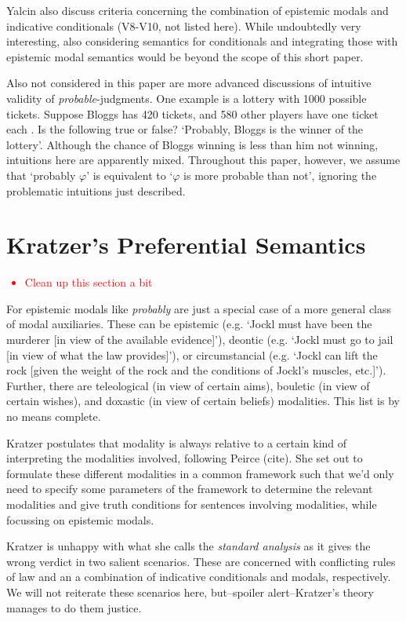 \documentclass{article}
\theoremstyle{definition}
\newcommand\todo[1]{\textcolor{red}{#1}}
\begin{document}
Yalcin also discuss criteria concerning the combination of epistemic modals and indicative conditionals (V8-V10, not listed here). While undoubtedly very interesting, also considering semantics for conditionals and integrating those with epistemic modal semantics would be beyond the scope of this short paper.

Also not considered in this paper are more advanced discussions of intuitive validity of \emph{probable}-judgments. One example is a lottery with 1000 possible tickets.
Suppose Bloggs has 420 tickets, and 580 other players have one ticket each \parencite[p.~931]{yalcin10_probab_operat}. Is the following true or false?
`Probably, Bloggs is the winner of the lottery'. Although the chance of Bloggs winning is less than him not winning, intuitions here are apparently mixed. Throughout this paper, however, we assume that `probably $\varphi$' is equivalent to `$\varphi$ is more probable than not', ignoring the problematic intuitions just described.

\section{Kratzer's Preferential Semantics}
\todo{
  \begin{itemize}
    \item Clean up this section a bit
  \end{itemize}
}
For \textcite{kratzer91_modal} epistemic modals like \emph{probably} are just a special case of a more general class of modal auxiliaries.
These can be epistemic (e.g. `Jockl must have been the murderer [in view of the available evidence]'), deontic (e.g. `Jockl must go to jail [in view of what the law provides]'), or circumstancial (e.g. `Jockl can lift the rock [given the weight of the rock and the conditions of Jockl's muscles, etc.]').
Further, there are teleological (in view of certain aims), bouletic (in view of certain wishes), and doxastic (in view of certain beliefs) modalities.
This list is by no means complete.

Kratzer postulates that modality is always relative to a certain kind of interpreting the modalities involved, following Peirce (cite).
She set out to formulate these different modalities in a common framework such that we'd only need to specify some parameters of the framework to determine the relevant modalities and give truth conditions for sentences involving modalities, while focussing on epistemic modals.

Kratzer is unhappy with what she calls the \emph{standard analysis} as it gives the wrong verdict in two salient scenarios.
These are concerned with conflicting rules of law and an a combination of indicative conditionals and modals, respectively.
We will not reiterate these scenarios here, but--spoiler alert--Kratzer's theory manages to do them justice.
\end{document}
